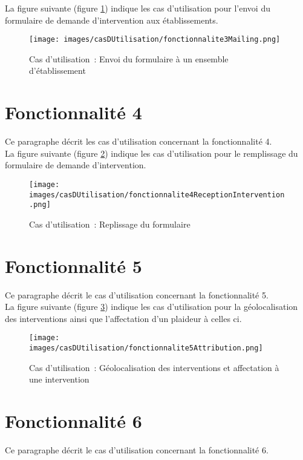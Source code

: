La figure suivante (figure \ref{diagrammeCasUtilisation3}) indique les cas d'utilisation pour l'envoi du formulaire de demande d'intervention aux établissements.
\begin{figure}[H]
	\centering
	\texttt{[image: images/casDUtilisation/fonctionnalite3Mailing.png]}
	\caption{Cas d'utilisation~: Envoi du formulaire à un ensemble d'établissement}
	\label{diagrammeCasUtilisation3}
\end{figure}

\section{Fonctionnalité 4}
Ce paragraphe décrit les cas d'utilisation concernant la fonctionnalité 4. \\

La figure suivante (figure \ref{diagrammeCasUtilisation4}) indique les cas d'utilisation pour le remplissage du formulaire de demande d'intervention.
\begin{figure}[H]
	\centering
	\texttt{[image: images/casDUtilisation/fonctionnalite4ReceptionIntervention.png]}
	\caption{Cas d'utilisation~: Replissage du formulaire}
	\label{diagrammeCasUtilisation4}
\end{figure}

\section{Fonctionnalité 5}
Ce paragraphe décrit le cas d'utilisation concernant la fonctionnalité 5. \\

La figure suivante (figure \ref{diagrammeCasUtilisation5}) indique les cas d'utilisation pour la géolocalisation des interventions ainsi que l'affectation d'un plaideur à celles ci. \\
\begin{figure}[H]
	\centering
	\texttt{[image: images/casDUtilisation/fonctionnalite5Attribution.png]}
	\caption{Cas d'utilisation~: Géolocalisation des interventions et affectation à une intervention}
	\label{diagrammeCasUtilisation5}
\end{figure}

\section{Fonctionnalité 6}
Ce paragraphe décrit le cas d'utilisation concernant la fonctionnalité 6. \\

